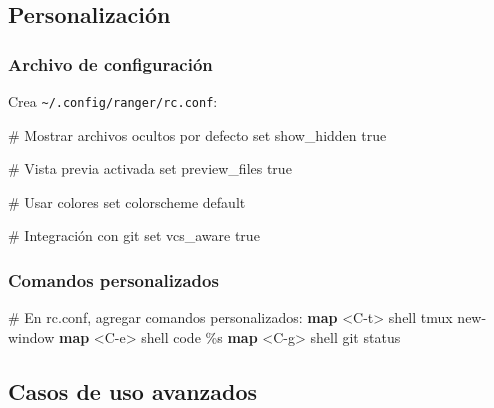 \documentclass[
  11pt,
  letterpaper,
  oneside,
  openany]{scrbook}
\newenvironment{Shaded}{}{}
\newcommand{\BuiltInTok}[1]{\textcolor[rgb]{0.84,0.23,0.29}{#1}}
\newcommand{\CommentTok}[1]{\textcolor[rgb]{0.42,0.45,0.49}{#1}}
\newcommand{\ExtensionTok}[1]{\textcolor[rgb]{0.84,0.23,0.29}{\textbf{#1}}}
\newcommand{\NormalTok}[1]{\textcolor[rgb]{0.14,0.16,0.18}{#1}}
\newcommand{\OperatorTok}[1]{\textcolor[rgb]{0.14,0.16,0.18}{#1}}
\begin{document}
\subsection{Personalización}\label{personalizaciuxf3n-1}

\subsubsection{Archivo de
configuración}\label{archivo-de-configuraciuxf3n}

Crea \texttt{\textasciitilde{}/.config/ranger/rc.conf}:

\begin{Shaded}
\begin{Highlighting}[]
\CommentTok{\# Mostrar archivos ocultos por defecto}
\BuiltInTok{set}\NormalTok{ show\_hidden true}

\CommentTok{\# Vista previa activada}
\BuiltInTok{set}\NormalTok{ preview\_files true}

\CommentTok{\# Usar colores}
\BuiltInTok{set}\NormalTok{ colorscheme default}

\CommentTok{\# Integración con git}
\BuiltInTok{set}\NormalTok{ vcs\_aware true}
\end{Highlighting}
\end{Shaded}

\subsubsection{Comandos personalizados}\label{comandos-personalizados}

\begin{Shaded}
\begin{Highlighting}[]
\CommentTok{\# En rc.conf, agregar comandos personalizados:}
\ExtensionTok{map} \OperatorTok{\textless{}}\NormalTok{C{-}t}\OperatorTok{\textgreater{}}\NormalTok{ shell tmux new{-}window}
\ExtensionTok{map} \OperatorTok{\textless{}}\NormalTok{C{-}e}\OperatorTok{\textgreater{}}\NormalTok{ shell code \%s}
\ExtensionTok{map} \OperatorTok{\textless{}}\NormalTok{C{-}g}\OperatorTok{\textgreater{}}\NormalTok{ shell git status}
\end{Highlighting}
\end{Shaded}

\subsection{Casos de uso avanzados}\label{casos-de-uso-avanzados-2}
\end{document}
